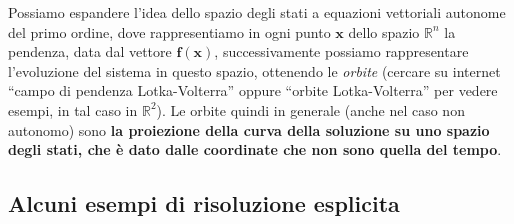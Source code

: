 Possiamo espandere l'idea dello spazio degli stati a equazioni vettoriali
autonome del primo ordine, dove rappresentiamo in ogni punto \(\mathbf{x}\) dello spazio
\(\mathbb{R}^{n}\) la pendenza, data dal vettore \(\mathbf{f}(\mathbf{x})\),
successivamente possiamo rappresentare l'evoluzione del sistema in questo
spazio, ottenendo le \emph{orbite} (cercare su internet ``campo di pendenza
Lotka-Volterra'' oppure ``orbite Lotka-Volterra'' per vedere esempi, in tal caso
in \(\mathbb{R}^2\)). Le orbite quindi in generale (anche nel caso non autonomo)
sono \textbf{la proiezione della curva della soluzione su uno spazio degli
stati, che è dato dalle coordinate che non sono quella del tempo}.

\subsection{Alcuni esempi di risoluzione esplicita}
